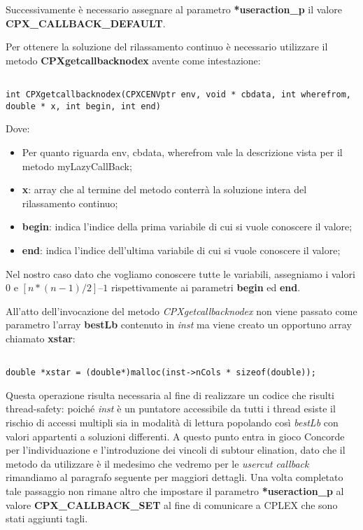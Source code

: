 \documentclass[11pt]{article}
\begin{document}
Successivamente è necessario assegnare al parametro \textbf{*useraction\_p} il valore \textbf{CPX\_CALLBACK\_DEFAULT}.

Per ottenere la soluzione del rilassamento continuo è necessario utilizzare il metodo \textbf{CPXgetcallbacknodex} avente come intestazione:

\begin{lstlisting}

int CPXgetcallbacknodex(CPXCENVptr env, void * cbdata, int wherefrom, double * x, int begin, int end) 

\end{lstlisting}

Dove:

\begin{itemize}
    \item Per quanto riguarda env, cbdata, wherefrom vale la descrizione vista per il metodo myLazyCallBack;
    \item \textbf{x}: array che al termine del metodo conterrà la soluzione intera del rilassamento continuo;
    \item \textbf{begin}: indica l’indice della prima variabile di cui si vuole conoscere il valore;
    \item \textbf{end}: indica l’indice dell’ultima variabile di cui si vuole conoscere il valore;
\end{itemize}

Nel nostro caso dato che vogliamo conoscere tutte le variabili, assegniamo i valori \textbf{$0$} e \textbf{$[n*(n-1)/2] – 1$} rispettivamente ai parametri \textbf{begin} ed \textbf{end}.

All'atto dell'invocazione del metodo \textit{CPXgetcallbacknodex} non viene passato come parametro l'array \textbf{bestLb} contenuto in \textit{inst} ma viene creato un opportuno array chiamato \textbf{xstar}:

\begin{lstlisting}

double *xstar = (double*)malloc(inst->nCols * sizeof(double));

\end{lstlisting}

Questa operazione risulta necessaria al fine di realizzare un codice che risulti thread-safety: poiché \textit{inst} è un puntatore accessibile da tutti i thread esiste il rischio di accessi multipli sia in modalità di lettura popolando così \textit{bestLb} con valori appartenti a soluzioni differenti.
A questo punto entra in gioco Concorde per l'individuazione e l'introduzione dei vincoli di subtour elination, dato che il metodo da utilizzare è il medesimo che vedremo per le \textit{usercut callback} rimandiamo al paragrafo seguente per maggiori dettagli.
Una volta completato tale passaggio non rimane altro che impostare il parametro \textbf{*useraction\_p} al valore \textbf{CPX\_CALLBACK\_SET} al fine di comunicare a CPLEX che sono stati aggiunti tagli.
\end{document}
